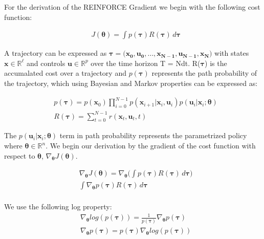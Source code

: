 \documentclass[11pt]{homework}
\renewcommand{\vec}[1]{\ensuremath{\boldsymbol{#1}}}
\begin{document}
\renewcommand{\questiontype}{Problem}
\question
\begin{arabicparts}

\questionpart

	For the derivation of the REINFORCE Gradient we begin with the following cost function: 

		\begin{align*}
			& J(\vec{\theta}) = \int p(\vec{\tau})R(\vec{\tau}) \,d\vec{\tau} 
		\end{align*}
		
	A trajectory can be expressed as $\vec{\tau} = (\vec{x_{0}}, \vec{u_{0}},\dots,\vec{x_{N-1}}, \vec{u_{N-1}}, \vec{x_{N})}$ with states $\vec{x} \in \mathds{R}^{\ell}$ and controls $\vec{u} \in \mathds{R}^{p}$ over the time horizon T = Ndt. R(\vec{\tau}) is the accumalated cost over a trajectory and $p(\vec{\tau})$ represents the path probability of the trajectory, which using Bayesian and Markov properties can be expressed as: 
	
		\begin{align*}
			& p(\vec{\tau}) = p(\vec{x}_0)\prod_{i=0}^{N-1} p(\vec{x}_{i+1}|\vec{x}_i,\vec{u}_i)p(\vec{u}_{i}|\vec{x}_{i};\vec{\theta}) \\
			& R(\vec{\tau}) = \sum_{t=0}^{N-1} r(\vec{x}_{t},\vec{u}_{t},t) 
		\end{align*}
	
	The $p(\vec{u}_{i}|\vec{x}_{i};\vec{\theta})$ term in path probability represents the parametrized policy where $\vec{\theta} \in  \mathds{R}^{n}$. We begin our derivation by the gradient of the cost function with respect to $\vec{\theta}$, $\nabla_{\vec{\theta}}J(\vec{\theta})$. 
		
		 \begin{align*}
			& \nabla_{\vec{\theta}}J(\vec{\theta}) = \nabla_{\vec{\theta}}\Bigg( \int p(\vec{\tau})R(\vec{\tau}) \,d\vec{\tau} \Bigg) \\
			& \int \nabla_{\vec{\theta}}p(\vec{\tau})R(\vec{\tau}) \,d\vec{\tau} \\
		\end{align*}
	
	We use the following log property:
		\begin{align*}
			& \nabla_{\vec{\theta}} log(p(\vec{\tau})) = \frac{1}{p(\vec{\tau})}\nabla_{\vec{\theta}} p(\vec{\tau}) \\
			& \nabla_{\vec{\theta}} p(\vec{\tau}) = p(\vec{\tau})\nabla_{\vec{\theta}} log(p(\vec{\tau}))
		\end{align*}


\end{arabicparts}
\end{document}
